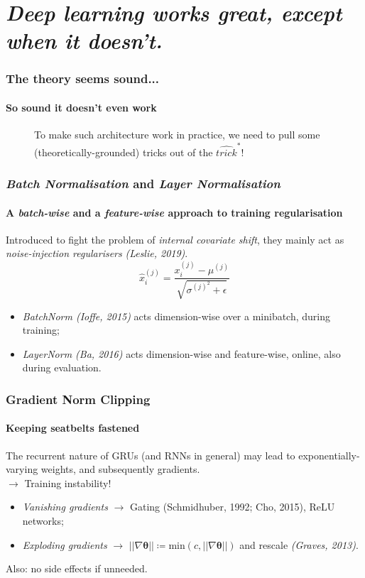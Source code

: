 \documentclass{beamer}
\begin{document}
\section{\textit{Deep learning works great, except when it doesn't.}}{
\begin{frame}
	\frametitle{The theory seems sound...}
	\framesubtitle{So sound it doesn't even work}
	\begin{figure}
		To make such architecture work in practice, we need to pull some (theoretically-grounded) tricks out of the $\widehat{trick}^*$!
	\end{figure}
\hfill{}
\end{frame}
\begin{frame}
	\frametitle{\textit{Batch Normalisation} and \textit{Layer Normalisation}}
	\framesubtitle{A \textit{batch-wise} and a \textit{feature-wise} approach to training regularisation}

	Introduced to fight the problem of \textit{internal covariate shift}, they mainly act as \textit{noise-injection regularisers} \textit{(Leslie, 2019)}.
\hfill\break
	$$
	\hat{x}^{(j)}_i = \frac{x^{(j)}_i - \mu^{(j)}}{\sqrt{\sigma^{(j)^2} + \epsilon}}
	$$
	\begin{itemize}
		\item{\textit{BatchNorm (Ioffe, 2015)} acts dimension-wise over a minibatch, during training;}
		\item{\textit{LayerNorm (Ba, 2016)} acts dimension-wise and feature-wise, online, also during evaluation.}
	\end{itemize}
\end{frame}
\begin{frame}
	\frametitle{Gradient Norm Clipping}
	\framesubtitle{Keeping seatbelts fastened}
	The recurrent nature of GRUs (and RNNs in general) may lead to exponentially-varying weights, and subsequently gradients. \\ $\rightarrow$ Training instability!
\hfill\break

\begin{itemize}
	\item{\textit{Vanishing gradients} $\rightarrow$ Gating (Schmidhuber, 1992; Cho, 2015), ReLU networks;}
	\item{\textit{Exploding gradients} $\rightarrow$ $ ||\nabla \boldsymbol{\theta}|| \coloneqq \text{min}(c, ||\nabla \boldsymbol{\theta}||)$ and rescale \textit{(Graves, 2013)}.}
\end{itemize}
\hfill\break
Also: no side effects if unneeded.


\end{frame}}
\end{document}

